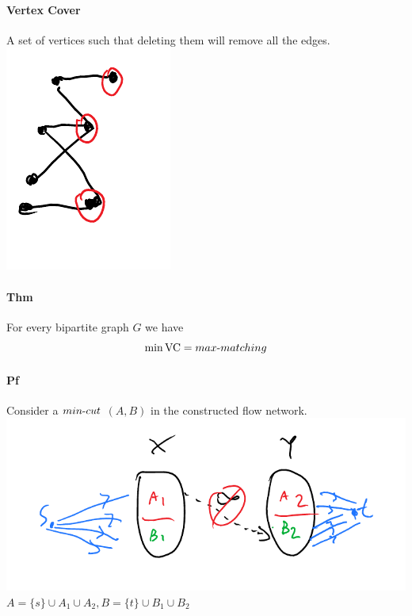\documentclass[12 pt]{article}
\begin{document}
        \paragraph{Vertex Cover} A set of vertices such that deleting
        them will remove all the edges.
        \\ \includegraphics[width=.9\textwidth]{i63.pdf}
        \paragraph{Thm} For every bipartite graph $G$ we have
        $$ \min\hbox{VC} = max\hbox{-}matching$$
        \paragraph{Pf} Consider a $min\hbox{-}cut$ $(A,B)$ in the
        constructed flow network.
        \\ \includegraphics[width=.9\textwidth]{i64.pdf}
        \\ $A=\{s\} \cup A_1 \cup A_2, B= \{t\} \cup B_1 \cup B_2$
\end{document}
